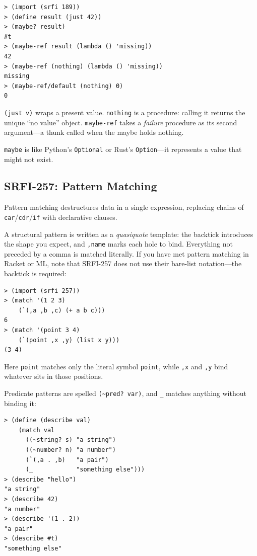 \begin{lstlisting}[style=repl]
> (import (srfi 189))
> (define result (just 42))
> (maybe? result)
#t
> (maybe-ref result (lambda () 'missing))
42
> (maybe-ref (nothing) (lambda () 'missing))
missing
> (maybe-ref/default (nothing) 0)
0
\end{lstlisting}

\texttt{(just v)} wraps a present value. \texttt{nothing} is a procedure: calling it returns the unique ``no value'' object. \texttt{maybe-ref} takes a \emph{failure} procedure as its second argument---a thunk called when the maybe holds nothing.

\texttt{maybe} is like Python's \texttt{Optional} or Rust's \texttt{Option}---it represents a value that might not exist.

\subsection{SRFI-257: Pattern Matching}

Pattern matching destructures data in a single expression, replacing chains of \texttt{car}/\texttt{cdr}/\texttt{if} with declarative clauses.

A structural pattern is written as a \emph{quasiquote} template: the backtick introduces the shape you expect, and \texttt{,name} marks each hole to bind. Everything not preceded by a comma is matched literally. If you have met pattern matching in Racket or ML, note that SRFI-257 does not use their bare-list notation---the backtick is required:

\begin{lstlisting}[style=repl]
> (import (srfi 257))
> (match '(1 2 3)
    (`(,a ,b ,c) (+ a b c)))
6
> (match '(point 3 4)
    (`(point ,x ,y) (list x y)))
(3 4)
\end{lstlisting}

Here \texttt{point} matches only the literal symbol \texttt{point}, while \texttt{,x} and \texttt{,y} bind whatever sits in those positions.

Predicate patterns are spelled \texttt{(\textasciitilde pred?\ var)}, and \texttt{\_} matches anything without binding it:

\begin{lstlisting}[style=repl]
> (define (describe val)
    (match val
      ((~string? s) "a string")
      ((~number? n) "a number")
      (`(,a . ,b)   "a pair")
      (_            "something else")))
> (describe "hello")
"a string"
> (describe 42)
"a number"
> (describe '(1 . 2))
"a pair"
> (describe #t)
"something else"
\end{lstlisting}

